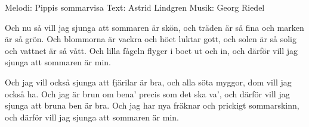 \begin{song}

\begin{songmeta}
Melodi: Pippis sommarvisa
Text: Astrid Lindgren
Musik: Georg Riedel
\end{songmeta}

\begin{songtext}
Och nu så vill jag sjunga att sommaren är skön,
och träden är så fina och marken är så grön.
Och blommorna är vackra och höet luktar gott,
och solen är så solig och vattnet är så vått.
Och lilla fågeln flyger i boet ut och in,
och därför vill jag sjunga att sommaren är min.

Och jag vill också sjunga att fjärilar är bra,
och alla söta myggor, dom vill jag också ha.
Och jag är brun om bena' precis som det ska va',
och därför vill jag sjunga att bruna ben är bra.
Och jag har nya fräknar och prickigt sommarskinn,
och därför vill jag sjunga att sommaren är min.
\end{songtext}
\end{song}
